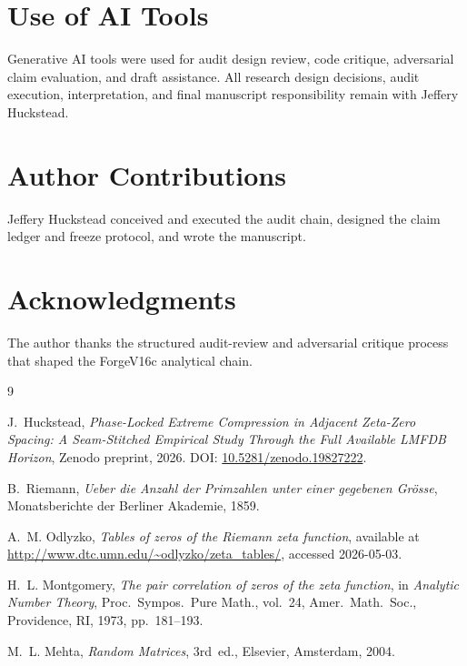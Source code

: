 \documentclass[11pt]{article}
\newcommand{\principaldoi}{10.5281/zenodo.19827222}
\begin{document}
\section*{Use of AI Tools}

Generative AI tools were used for audit design review, code critique,
adversarial claim evaluation, and draft assistance. All research design
decisions, audit execution, interpretation, and final manuscript
responsibility remain with Jeffery Huckstead.

\section*{Author Contributions}

Jeffery Huckstead conceived and executed the audit chain, designed the
claim ledger and freeze protocol, and wrote the manuscript.

\section*{Acknowledgments}

The author thanks the structured audit-review and adversarial critique
process that shaped the ForgeV16c analytical chain.

\begin{thebibliography}{9}

J.~Huckstead,
\emph{Phase-Locked Extreme Compression in Adjacent Zeta-Zero Spacing:
  A Seam-Stitched Empirical Study Through the Full Available LMFDB
  Horizon},
Zenodo preprint, 2026.
DOI: \href{https://doi.org/\principaldoi}{\principaldoi}.

B.~Riemann,
\emph{Ueber die Anzahl der Primzahlen unter einer gegebenen Gr\"osse},
Monatsberichte der Berliner Akademie, 1859.

A.~M. Odlyzko,
\emph{Tables of zeros of the Riemann zeta function},
available at
\url{http://www.dtc.umn.edu/~odlyzko/zeta_tables/},
accessed 2026-05-03.

H.~L. Montgomery,
\emph{The pair correlation of zeros of the zeta function},
in \emph{Analytic Number Theory},
Proc.\ Sympos.\ Pure Math., vol.~24,
Amer.\ Math.\ Soc., Providence, RI, 1973, pp.~181--193.

M.~L. Mehta,
\emph{Random Matrices},
3rd~ed., Elsevier, Amsterdam, 2004.

\end{thebibliography}
\end{document}
